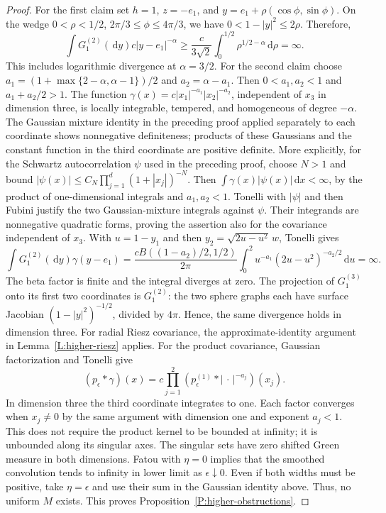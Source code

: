 \documentclass[12pt]{article}
\numberwithin{equation}{section}
\theoremstyle{definition}
\newcommand{\ud}{\,\mathrm{d}}
\begin{document}
\begin{proof}
  For the first claim set $h=1$, $z=-e_1$, and
  $y=e_1+\rho(\cos\phi,\sin\phi)$. On the wedge
  $0<\rho<1/2$, $2\pi/3\le\phi\le4\pi/3$, we have
  $0<1-|y|^2\le2\rho$. Therefore,
  \[
    \int G_1^{(2)}(\ud y)c|y-e_1|^{-\alpha}
    \ge\frac{c}{3\sqrt2}\int_0^{1/2}\rho^{1/2-\alpha}\ud\rho
    =\infty.
  \]
  This includes logarithmic divergence at $\alpha=3/2$.
  For the second claim choose
  $a_1=(1+\max\{2-\alpha,\alpha-1\})/2$ and $a_2=\alpha-a_1$.
  Then $0<a_1,a_2<1$ and $a_1+a_2/2>1$.
  The function $\gamma(x)=c|x_1|^{-a_1}|x_2|^{-a_2}$, independent
  of $x_3$ in dimension three, is locally integrable, tempered, and
  homogeneous of degree $-\alpha$. The Gaussian mixture identity
  in the preceding proof applied separately to each coordinate shows
  nonnegative definiteness; products of these Gaussians and the
  constant function in the third coordinate are positive definite.
  More explicitly, for the Schwartz autocorrelation $\psi$ used in
  the preceding proof, choose $N>1$ and bound
  $|\psi(x)|\le C_N\prod_{j=1}^d(1+|x_j|)^{-N}$.
  Then $\int\gamma(x)|\psi(x)|\ud x<\infty$, by the product
  of one-dimensional integrals and $a_1,a_2<1$. Tonelli with
  $|\psi|$ and then Fubini justify the two Gaussian-mixture integrals
  against $\psi$. Their integrands are nonnegative quadratic forms,
  proving the assertion also for the covariance independent of $x_3$.
  With $u=1-y_1$ and then $y_2=\sqrt{2u-u^2}\,w$, Tonelli gives
  \[
    \int G_1^{(2)}(\ud y)\gamma(y-e_1)
    =\frac{c B((1-a_2)/2,1/2)}{2\pi}
    \int_0^2u^{-a_1}(2u-u^2)^{-a_2/2}\ud u=\infty.
  \]
  The beta factor is finite and the integral diverges at zero.
  The projection of $G_1^{(3)}$ onto its first two coordinates is
  $G_1^{(2)}$: the two sphere graphs each have surface Jacobian
  $(1-|y|^2)^{-1/2}$, divided by $4\pi$. Hence, the same divergence
  holds in dimension three. For radial Riesz covariance, the
  approximate-identity argument in Lemma~\ref{L:higher-riesz} applies.
  For the product covariance, Gaussian factorization and Tonelli give
  \[
    (p_\epsilon*\gamma)(x)
    =c\prod_{j=1}^2
    (p_\epsilon^{(1)}*|\,\cdot\,|^{-a_j})(x_j).
  \]
  In dimension three the third coordinate integrates to one. Each
  factor converges when $x_j\ne0$ by the same argument with dimension
  one and exponent $a_j<1$. This does not require the product kernel
  to be bounded at infinity; it is unbounded along its singular axes.
  The singular sets have zero shifted Green measure in both dimensions.
  Fatou with $\eta=0$ implies that the smoothed
  convolution tends to infinity in lower limit as $\epsilon\downarrow0$.
  Even if both widths must be positive, take $\eta=\epsilon$ and use
  their sum in the Gaussian identity above. Thus, no uniform $M$ exists.
  This proves Proposition~\ref{P:higher-obstructions}.
\end{proof}
\end{document}
